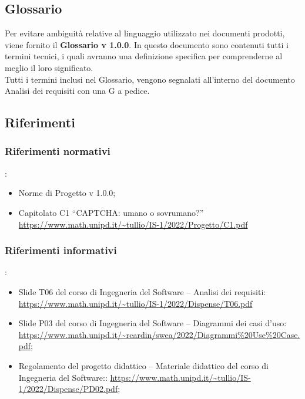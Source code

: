 \subsection{Glossario}
Per evitare ambiguità relative al linguaggio utilizzato nei documenti prodotti, viene fornito il \textbf{Glossario v 1.0.0}. In questo documento sono contenuti tutti i termini tecnici, i quali avranno una definizione specifica per comprenderne al meglio il loro significato.\\
Tutti i termini inclusi nel Glossario, vengono segnalati all'interno del documento Analisi dei requisiti con una G a pedice.

\subsection{Riferimenti}

\subsubsection{Riferimenti normativi}:
\begin{itemize}
	\item Norme di Progetto v 1.0.0;
	\item Capitolato C1 “CAPTCHA: umano o sovrumano?”
		\url{https://www.math.unipd.it/~tullio/IS-1/2022/Progetto/C1.pdf}
\end{itemize}

\subsubsection{Riferimenti informativi}:
\begin{itemize}
	\item Slide T06 del corso di Ingegneria del Software – Analisi dei requisiti:
		\url{https://www.math.unipd.it/~tullio/IS-1/2022/Dispense/T06.pdf}
	\item Slide P03 del corso di Ingegneria del Software – Diagrammi dei casi d'uso:
		\url{https://www.math.unipd.it/~rcardin/swea/2022/Diagrammi%20Use%20Case.pdf};
	\item Regolamento del progetto didattico – Materiale didattico del corso di Ingegneria del Software::
		\url{https://www.math.unipd.it/~tullio/IS-1/2022/Dispense/PD02.pdf};
\end{itemize}

